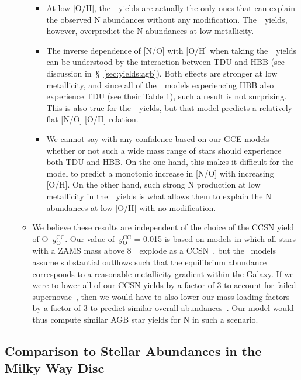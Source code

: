 \documentclass[ms.tex]{subfiles}
\begin{document}
\begin{itemize}
\begin{itemize}
\begin{itemize}
			\item At low [O/H], the~\karakas~yields are actually the only ones 
			that can explain the observed N abundances without any 
			modification. 
			The~\karakasten~yields, however, overpredict the N abundances at 
			low metallicity. 

			\item The inverse dependence of [N/O] with [O/H] when taking 
			the~\karakasten~yields can be understood by the interaction between 
			TDU and HBB (see discussion in~\S~\ref{sec:yields:agb}). 
			Both effects are stronger at low metallicity, and since all of 
			the~\karakasten~models experiencing HBB also experience TDU (see 
			their Table 1), such a result is not surprising. 
			This is also true for the~\karakas~yields, but that model predicts 
			a relatively flat [N/O]-[O/H] relation. 
			
			\item We cannot say with any confidence based on our GCE models 
			whether or not such a wide mass range of stars should experience 
			both TDU and HBB. 
			On the one hand, this makes it difficult for the model to predict a 
			monotonic increase in [N/O] with increasing [O/H]. 
			On the other hand, such strong N production at low metallicity in 
			the~\karakas~yields is what allows them to explain the N abundances 
			at low [O/H] with no modification. 
		\end{itemize} 

		\item {\color{red} 
		We believe these results are independent of the choice of the 
		CCSN yield of O~$y_\text{O}^\text{CC}$. 
		Our value of~$y_\text{O}^\text{CC}$ = 0.015 is based on models in which 
		all stars with a ZAMS mass above 8~\msun~explode as a 
		CCSN~\citep[e.g.][]{Chieffi2013}, but the~\citet{Johnson2021} models 
		assume substantial outflows such that the equilibrium abundance 
		corresponds to a reasonable metallicity gradient within the Galaxy. 
		If we were to lower all of our CCSN yields by a factor of 3 to account 
		for failed supernovae~\citep[e.g.][]{Sukhbold2016}, then we would have 
		to also lower our mass loading factors by a factor of 3 to predict 
		similar overall abundances~\citep{Weinberg2017}. 
		Our model would thus compute similar AGB star yields for N in such a 
		scenario. 
		} 

	\end{itemize} 
\end{itemize} 

\subsection{Comparison to Stellar Abundances in the Milky Way Disc} 
\label{sec:results:vincenzo_comp} 
\end{document}
